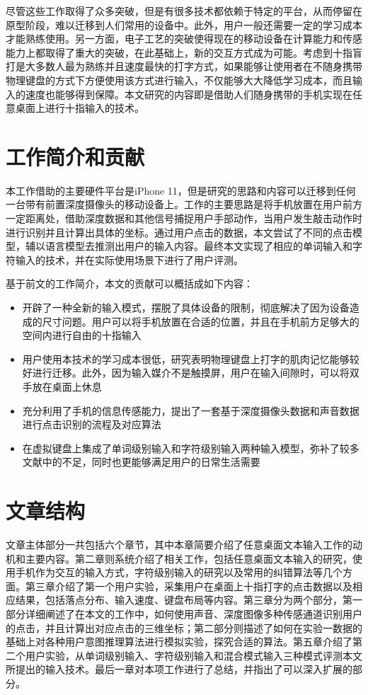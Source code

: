 尽管这些工作取得了众多突破，但是有很多技术都依赖于特定的平台，从而停留在原型阶段，难以迁移到人们常用的设备中。此外，用户一般还需要一定的学习成本才能熟练使用。另一方面，电子工艺的突破使得现在的移动设备在计算能力和传感能力上都取得了重大的突破，在此基础上，新的交互方式成为可能。考虑到十指盲打是大多数人最为熟练并且速度最快的打字方式，如果能够让使用者在不随身携带物理键盘的方式下方便使用该方式进行输入，不仅能够大大降低学习成本，而且输入的速度也能够得到保障。本文研究的内容即是借助人们随身携带的手机实现在任意桌面上进行十指输入的技术。

\section{工作简介和贡献}
本工作借助的主要硬件平台是iPhone 11，但是研究的思路和内容可以迁移到任何一台带有前置深度摄像头的移动设备上。工作的主要思路是将手机放置在用户前方一定距离处，借助深度数据和其他信号捕捉用户手部动作，当用户发生敲击动作时进行识别并且计算出具体的坐标。通过用户点击的数据，本文尝试了不同的点击模型，辅以语言模型去推测出用户的输入内容。最终本文实现了相应的单词输入和字符输入的技术，并在实际使用场景下进行了用户评测。

基于前文的工作简介，本文的贡献可以概括成如下内容：
\begin{itemize}
    \item 开辟了一种全新的输入模式，摆脱了具体设备的限制，彻底解决了因为设备造成的尺寸问题。用户可以将手机放置在合适的位置，并且在手机前方足够大的空间内进行自由的十指输入
    \item 用户使用本技术的学习成本很低，研究表明物理键盘上打字的肌肉记忆能够较好进行迁移\cite{palmboard2020}\cite{2018shitoast}。此外，因为输入媒介不是触摸屏，用户在输入间隙时，可以将双手放在桌面上休息
    \item 充分利用了手机的信息传感能力，提出了一套基于深度摄像头数据和声音数据进行点击识别的流程及对应算法
    \item 在虚拟键盘上集成了单词级别输入和字符级别输入两种输入模型，弥补了较多文献中的不足，同时也更能够满足用户的日常生活需要
\end{itemize}

\section{文章结构}
文章主体部分一共包括六个章节，其中本章简要介绍了任意桌面文本输入工作的动机和主要内容。第二章则系统介绍了相关工作，包括任意桌面文本输入的研究，使用手机作为交互的输入方式，字符级别输入的研究以及常用的纠错算法等几个方面。第三章介绍了第一个用户实验，采集用户在桌面上十指打字的点击数据以及相应结果，包括落点分布、输入速度、键盘布局等内容。第三章分为两个部分，第一部分详细阐述了在本文的工作中，如何使用声音、深度图像多种传感通道识别用户的点击，并且计算出对应点击的三维坐标；第二部分则描述了如何在实验一数据的基础上对各种用户意图推理算法进行模拟实验，探究合适的算法。第五章介绍了第二个用户实验，从单词级别输入、字符级别输入和混合模式输入三种模式评测本文所提出的输入技术。最后一章对本项工作进行了总结，并指出了可以深入扩展的部分。